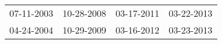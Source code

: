 \begin{supertabular}{llll}
 07-11-2003 &  10-28-2008 &  03-17-2011 &  03-22-2013 \\
 04-24-2004 &  10-29-2009 &  03-16-2012 &  03-23-2013 \\
\end{supertabular}
